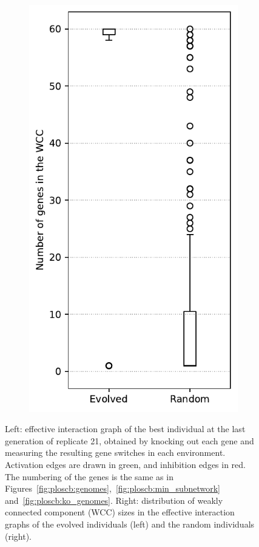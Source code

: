 \begin{figure}[H]
\begin{subfigure}[c]{0.29\textwidth}
\includegraphics[width=\textwidth]{ploscb/img/effective_graph_wcc_distr.pdf}
\end{subfigure}
\caption[Effective interaction graph of an evolved individual, and distribution of effective interaction graph WCCs in evolved and random individuals]{Left: effective interaction graph of the best individual at the last generation of replicate 21, obtained by knocking out each gene and measuring the resulting gene switches in each environment.
Activation edges are drawn in green, and inhibition edges in red.
The numbering of the genes is the same as in Figures~\ref{fig:ploscb:genomes},~\ref{fig:ploscb:min_subnetwork} and~\ref{fig:ploscb:ko_genomes}.
Right: distribution of weakly connected component (WCC) sizes in the effective interaction graphs of the evolved individuals (left) and the random individuals (right).}
\label{fig:ploscb:ko_graph}
\end{figure}


